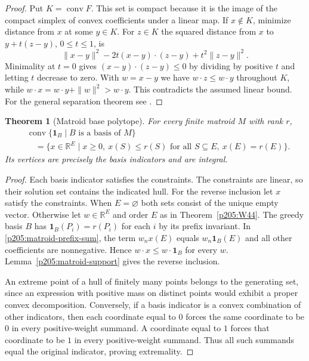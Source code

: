 \documentclass[11pt,oneside,openany]{book}
\theoremstyle{plain}
\newtheorem{theorem}{Theorem}[chapter]
\theoremstyle{definition}
\theoremstyle{remark}
\begin{document}
\begin{proof}
Put \(K=\operatorname{conv}F\). This set is compact because it is
the image of the compact simplex of convex coefficients under a
linear map. If \(x\notin K\), minimize distance from \(x\) at some
\(y\in K\). For \(z\in K\) the squared distance from \(x\) to
\(y+t(z-y)\), \(0\le t\le 1\), is
\[
 \|x-y\|^2-2t(x-y)\cdot(z-y)+t^2\|z-y\|^2.
\]
Minimality at \(t=0\) gives \((x-y)\cdot(z-y)\le0\) by dividing
by positive \(t\) and letting \(t\) decrease to zero. With
\(w=x-y\) we have \(w\cdot z\le w\cdot y\) throughout \(K\), while
\(w\cdot x=w\cdot y+\|w\|^2>w\cdot y\). This contradicts the
assumed linear bound. For the general separation theorem see
\cite[Chapter~1, Open and compact--closed separation]{p106}.
\end{proof}

\begin{theorem}[Matroid base polytope]
\label{p205:W45}
For every finite matroid \(M\) with rank \(r\),
\[
 \begin{aligned}
 &\operatorname{conv}\{\mathbf 1_B\mid B\text{ is a basis of }M\}\\
 &\quad =
 \{x\in\mathbb R^E\mid x\ge 0,\ x(S)\le r(S)\text{ for all }S\subseteq E,\
                  x(E)=r(E)\}.
 \end{aligned}
\]
Its vertices are precisely the basis indicators and are integral.
\end{theorem}

\begin{proof}
Each basis indicator satisfies the constraints. The constraints
are linear, so their solution set contains the indicated hull.
For the reverse inclusion let \(x\) satisfy the constraints.
When \(E=\varnothing\) both sets consist of the unique empty vector.
Otherwise let \(w\in\mathbb R^E\) and order \(E\) as in
Theorem~\ref{p205:W44}. The greedy basis \(B\) has
\(\mathbf 1_B(P_i)=r(P_i)\) for each \(i\) by its prefix invariant.
In \eqref{p205:matroid-prefix-sum}, the term \(w_n x(E)\) equals
\(w_n\mathbf 1_B(E)\) and all other coefficients are nonnegative.
Hence \(w\cdot x\le w\cdot\mathbf 1_B\) for every \(w\).
Lemma~\ref{p205:matroid-support} gives the reverse inclusion.

An extreme point of a hull of finitely many points belongs to
the generating set, since an expression with positive mass on
distinct points would exhibit a proper convex decomposition.
Conversely, if a basis indicator is a convex combination of other
indicators, then each coordinate equal to \(0\) forces the same
coordinate to be \(0\) in every positive-weight summand.
A coordinate equal to \(1\) forces that coordinate to be \(1\)
in every positive-weight summand. Thus all such summands equal
the original indicator, proving extremality.
\end{proof}
\end{document}
